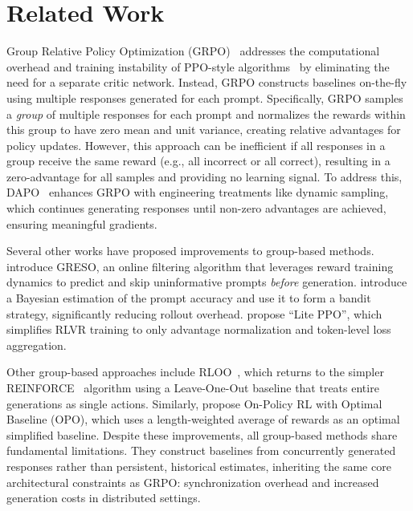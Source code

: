 \section{Related Work}\label{sec:related}

Group Relative Policy Optimization (GRPO)~\cite{GRPO} addresses the computational overhead and training instability of PPO-style algorithms~\cite{PPO} by eliminating the need for a separate critic network. Instead, GRPO constructs baselines on-the-fly using multiple responses generated for each prompt. Specifically, GRPO samples a \emph{group} of multiple responses for each prompt and normalizes the rewards within this group to have zero mean and unit variance, creating relative advantages for policy updates.
However, this approach can be inefficient if all responses in a group receive the same reward (e.g., all incorrect or all correct), resulting in a zero-advantage for all samples and providing no learning signal.
To address this, DAPO~\cite{DAPO} enhances GRPO with engineering treatments like dynamic sampling, which continues generating responses until non-zero advantages are achieved, ensuring meaningful gradients.

Several other works have proposed improvements to group-based methods. \citet{zheng2025act} introduce GRESO, an online filtering algorithm that leverages reward training dynamics to predict and skip uninformative prompts \textit{before} generation. \citet{qu2025can} introduce a Bayesian estimation of the prompt accuracy and use it to form a bandit strategy, significantly reducing rollout overhead. \citet{liu2025part} propose ``Lite PPO'', which simplifies RLVR training to only advantage normalization and token-level loss aggregation.

Other group-based approaches include RLOO~\cite{RLOO}, which returns to the simpler REINFORCE~\cite{REINFORCE,rlbook} algorithm using a Leave-One-Out baseline that treats entire generations as single actions. Similarly, \citet{hao2025policy} propose On-Policy RL with Optimal Baseline (OPO), which uses a length-weighted average of rewards as an optimal simplified baseline. Despite these improvements, all group-based methods share fundamental limitations. They construct baselines from concurrently generated responses rather than persistent, historical estimates, inheriting the same core architectural constraints as GRPO: synchronization overhead and increased generation costs in distributed settings.

